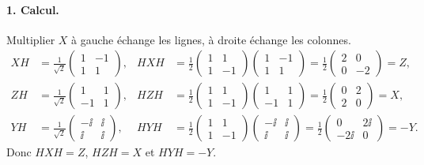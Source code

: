 \begin{correction}
\paragraph{1. Calcul.} Multiplier $X$ à gauche échange les lignes, à droite échange les colonnes.
\begin{align*}
  XH&=\tfrac{1}{\sqrt2}\begin{pmatrix}1&-1\\1&1\end{pmatrix},
  &HXH&=\tfrac12\begin{pmatrix}1&1\\1&-1\end{pmatrix}\begin{pmatrix}1&-1\\1&1\end{pmatrix}
        =\tfrac12\begin{pmatrix}2&0\\0&-2\end{pmatrix}=Z,\\[0.8ex]
  ZH&=\tfrac{1}{\sqrt2}\begin{pmatrix}1&1\\-1&1\end{pmatrix},
  &HZH&=\tfrac12\begin{pmatrix}1&1\\1&-1\end{pmatrix}\begin{pmatrix}1&1\\-1&1\end{pmatrix}
        =\tfrac12\begin{pmatrix}0&2\\2&0\end{pmatrix}=X,\\[0.8ex]
  YH&=\tfrac{1}{\sqrt2}\begin{pmatrix}-\ii&\ii\\\ii&\ii\end{pmatrix},
  &HYH&=\tfrac12\begin{pmatrix}1&1\\1&-1\end{pmatrix}\begin{pmatrix}-\ii&\ii\\\ii&\ii\end{pmatrix}
        =\tfrac12\begin{pmatrix}0&2\ii\\-2\ii&0\end{pmatrix}=-Y .
\end{align*}
Donc $HXH=Z$, $HZH=X$ et $HYH=-Y$.


\end{correction}
